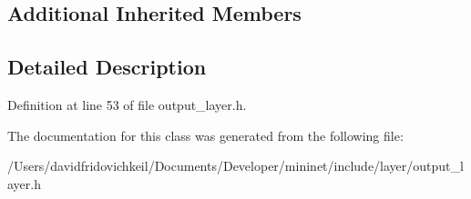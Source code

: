 \subsection*{Additional Inherited Members}


\subsection{Detailed Description}


Definition at line 53 of file output\+\_\+layer.\+h.



The documentation for this class was generated from the following file\+:\begin{DoxyCompactItemize}
\item 
/\+Users/davidfridovichkeil/\+Documents/\+Developer/mininet/include/layer/output\+\_\+layer.\+h\end{DoxyCompactItemize}
